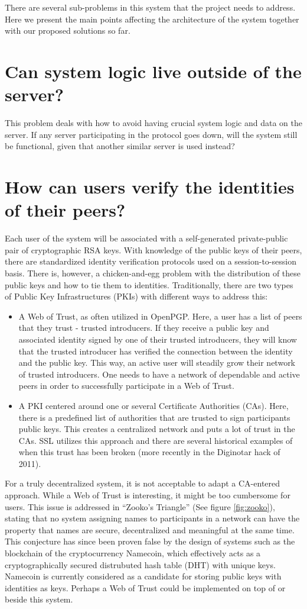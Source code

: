There are several sub-problems in this system that the project needs to address. Here we present the main points affecting the architecture of the system together with our proposed solutions so far.
\section{Can system logic live outside of the server?}
This problem deals with how to avoid having crucial system logic and data on the server. If any server participating in the protocol goes down, will the system still be functional, given that another similar server is used instead?
\section{How can users verify the identities of their peers?}
Each user of the system will be associated with a self-generated private-public pair of cryptographic RSA keys. With knowledge of the public keys of their peers, there are standardized identity verification protocols used on a session-to-session basis. There is, however, a chicken-and-egg problem with the distribution of these public keys and how to tie them to identities. Traditionally, there are two types of Public Key Infrastructures (PKIs) with different ways to address this:
\begin{itemize}
\item A Web of Trust, as often utilized in OpenPGP. Here, a user has a list of peers that they trust - trusted introducers. If they receive a public key and associated identity signed by one of their trusted introducers, they will know that the trusted introducer has verified the connection between the identity and the public key. This way, an active user will steadily grow their network of trusted introducers. One needs to have a network of dependable and active peers in order to successfully participate in a Web of Trust.
\item A PKI centered around one or several Certificate Authorities (CAs). Here, there is a predefined list of authorities that are trusted to sign participants public keys. This creates a centralized network and puts a lot of trust in the CAs. SSL utilizes this approach and there are several historical examples of when this trust has been broken (more recently in the Diginotar hack of 2011).
\end{itemize}
For a truly decentralized system, it is not acceptable to adapt a CA-entered approach. While a Web of Trust is interesting, it might be too cumbersome for users. This issue is addressed in “Zooko’s Triangle” (See figure \ref{fig:zooko}), stating that no system assigning names to participants in a network can have the property that names are secure, decentralized and meaningful at the same time. This conjecture has since been proven false by the design of systems such as the blockchain of the cryptocurrency Namecoin, which effectively acts as a cryptographically secured distrubuted hash table (DHT) with unique keys. Namecoin is currently considered as a candidate for storing public keys with identities as keys. Perhaps a Web of Trust could be implemented on top of or beside this system.
